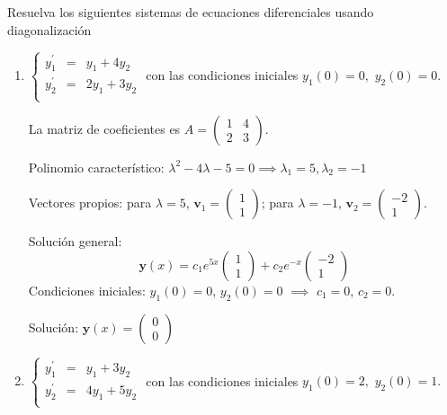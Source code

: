 \begin{prob}
Resuelva los siguientes sistemas de ecuaciones diferenciales usando diagonalización
\begin{enumerate}[$(a)$]
\item $\left\lbrace \begin{matrix}
y_{1}^{\prime}&=&y_1+4y_2\\
y_{2}^{\prime}&=&2y_1+3y_2\\
\end{matrix} \right. $ con las condiciones iniciales $y_{1}(0)=0,$ $y_{2}(0)=0.$

\begin{myproof}
La matriz de coeficientes es $A = \begin{pmatrix} 1 & 4 \\ 2 & 3 \end{pmatrix}$.

Polinomio característico: $\lambda^2 - 4\lambda - 5 = 0 \implies \lambda_1=5, \lambda_2=-1$

Vectores propios: para $\lambda=5$, $\mathbf{v}_1 = \begin{pmatrix} 1 \\ 1 \end{pmatrix}$; para $\lambda=-1$, $\mathbf{v}_2 = \begin{pmatrix} -2 \\ 1 \end{pmatrix}$.

Solución general:
\[
\mathbf{y}(x) = c_1 e^{5x} \begin{pmatrix} 1 \\ 1 \end{pmatrix} + c_2 e^{-x} \begin{pmatrix} -2 \\ 1 \end{pmatrix}
\]
Condiciones iniciales: $y_1(0)=0$, $y_2(0)=0$ $\implies$ $c_1 = 0$, $c_2 = 0$.

Solución: $\mathbf{y}(x) = \begin{pmatrix} 0 \\ 0 \end{pmatrix}$
\end{myproof}

\item $\left\lbrace \begin{matrix}
y_{1}^{\prime}&=&y_1+3y_2\\
y_{2}^{\prime}&=&4y_1+5y_2\\
\end{matrix} \right. $ con las condiciones iniciales $y_{1}(0)=2,$ $y_{2}(0)=1.$


\end{enumerate}
\end{prob}
